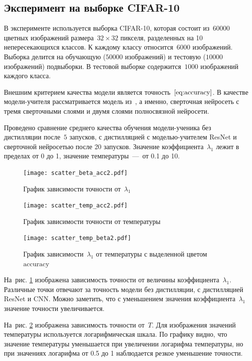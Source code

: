 \documentclass[12pt, twoside]{article}
\begin{document}
\subsection{Эксперимент на выборке CIFAR-10}
В эксперименте используется выборка CIFAR-10, которая состоит из~$60000$ цветных изображений размера~$32 \times 32$ пикселя, разделенных на 10 непересекающихся классов. К каждому классу относится~$6000$ изображений. Выборка делится на обучающую ($50000$ изображений) и тестовую ($10000$ изображений) подвыборки. В тестовой выборке содержится~$1000$ изображений каждого класса.

Внешним критерием качества модели является точность~$\eqref{eq:accuracy}$. В качестве модели-учителя рассматривается модель из~\cite{conf/cvpr/PassalisTT20}, а именно, сверточная нейросеть с тремя сверточными слоями и двумя слоями полносвязной нейросети.

Проведено сравнение среднего качества обучения модели-ученика без дистилляции после~$5$ запусков, с дистилляцией с моделью-учителем ResNet и сверточной нейросетью после 20 запусков. Значение коэффициента~$\lambda_1$ лежит в пределах от 0 до 1, значение температуры~---~от 0.1 до 10.

\begin{figure}[!ht]
\centering
\texttt{[image: scatter\_beta\_acc2.pdf]}
\caption{График зависимости точности от~$\lambda_1$}
\label{fig:beta_acc}
\end{figure}

\begin{figure}[!ht]
\centering
\texttt{[image: scatter\_temp\_acc2.pdf]}
\caption{График зависимости точности от температуры}
\label{fig:temp_acc}
\end{figure}

\begin{figure}[!ht]
\centering
\texttt{[image: scatter\_temp\_beta2.pdf]}
\caption{График зависимости~$\lambda_1$ от температуры с выделенной цветом~$\text{accuracy}$}
\label{fig:temp_beta}
\end{figure}

На~рис. \ref{fig:beta_acc} изображена зависимость точности от величины коэффициента~$\lambda_1$. Различные точки отвечают за точность модели без дистилляции, с дистилляцией ResNet и CNN. Можно заметить, что с уменьшением значения коэффициента~$\lambda_1$ значение точности увеличивается.

На~рис. \ref{fig:temp_acc} изображена зависимость точности от~$T$. Для изображения значений температуры используется логарифмическая шкала. По графику видно, что значение температуры уменьшается при увеличении логарифма температуры, но при значениях логарифма от 0.5 до 1 наблюдается резкое уменьшение точности.
\end{document}
